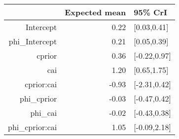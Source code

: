 \begin{tabular}{rrl}
  \hline
 & Expected mean & 95\% CrI \\ 
  \hline
Intercept & 0.22 & [0.03,0.41] \\ 
  phi\_Intercept & 0.21 & [0.05,0.39] \\ 
  cprior & 0.36 & [-0.22,0.97] \\ 
  cai & 1.20 & [0.65,1.75] \\ 
  cprior:cai & -0.93 & [-2.31,0.42] \\ 
  phi\_cprior & -0.03 & [-0.47,0.42] \\ 
  phi\_cai & -0.02 & [-0.43,0.38] \\ 
  phi\_cprior:cai & 1.05 & [-0.09,2.18] \\ 
   \hline
\end{tabular}

